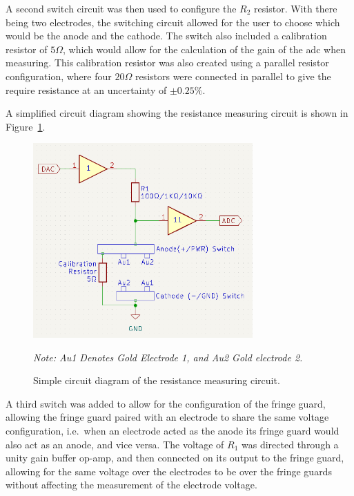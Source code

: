 A second switch circuit was then used to configure the $R_2$ resistor.
With there being two electrodes, the switching circuit allowed for the user to choose which would be the anode and the cathode.
The switch also included a calibration resistor of $5\Omega$, which would allow for the calculation of the gain of the \gls{adc} when measuring.
This calibration resistor was also created using a parallel resistor configuration, where four $20\Omega$ resistors were connected in parallel to give the require resistance at an uncertainty of $\pm0.25\%$.

A simplified circuit diagram showing the resistance measuring circuit is shown in Figure~\ref{fig:resistance_circuit}.

\begin{figure}[H]\label{fig:resistance_circuit}
    \centering
    \includegraphics[width=0.75\textwidth]{figures/fig_resistance_circuit.png}
    \caption{Simple circuit diagram of the resistance measuring circuit.}
    \textit{Note: Au1 Denotes Gold Electrode 1, and Au2 Gold electrode 2.}
    \label{fig:resistance_circuit}
\end{figure}

A third switch was added to allow for the configuration of the fringe guard, allowing the fringe guard paired with an electrode to share the same voltage configuration, i.e.~when an electrode acted as the anode its fringe guard would also act as an anode, and vice versa.
The voltage of $R_1$ was directed through a unity gain buffer op-amp, and then connected on its output to the fringe guard, allowing for the same voltage over the electrodes to be over the fringe guards without affecting the measurement of the electrode voltage.

